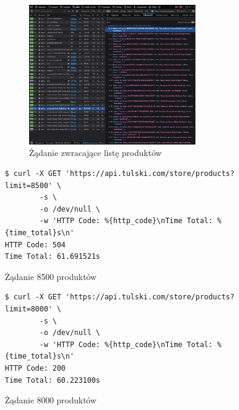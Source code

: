 \begin{figure}[p]
    \begin{figure}[H]
        \centering
        \includegraphics[width=0.8\textwidth]{img/store-get-products-list}
        \caption{Żądanie zwracające listę produktów}
        \label{fig:store-get-products-list}
    \end{figure}
    \begin{listing}[H]
        \begin{verbatim}
$ curl -X GET 'https://api.tulski.com/store/products?limit=8500' \
        -s \
        -o /dev/null \
        -w 'HTTP Code: %{http_code}\nTime Total: %{time_total}s\n'
HTTP Code: 504
Time Total: 61.691521s
        \end{verbatim}
        \caption{Żądanie 8500 produktów}
        \label{lst:store-get-products-list-8500}
    \end{listing}
    \begin{listing}[H]
        \begin{verbatim}
$ curl -X GET 'https://api.tulski.com/store/products?limit=8000' \
        -s \
        -o /dev/null \
        -w 'HTTP Code: %{http_code}\nTime Total: %{time_total}s\n'
HTTP Code: 200
Time Total: 60.223100s
        \end{verbatim}
        \caption{Żądanie 8000 produktów}
        \label{lst:store-get-products-list-8000}
    \end{listing}
\end{figure}



